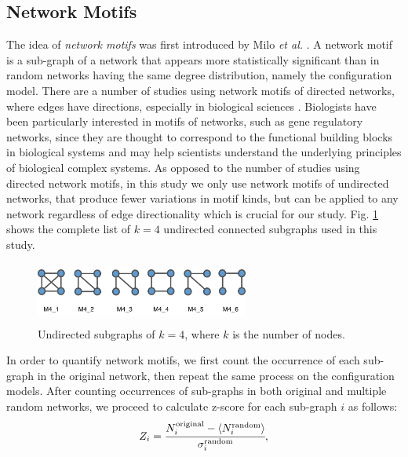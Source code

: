 \subsection*{Network Motifs} 
The idea of \textit{network motifs} was first introduced by Milo \textit{et al.} \cite{Milo_motif}. A network motif is a sub-graph of a network that appears more statistically significant than in random networks having the same degree distribution, namely the configuration model. There are a number of studies using network motifs of directed networks, where edges have directions, especially in biological sciences \cite{Alon2007, MotifsInBrain, NetworkMotifsEcoli}. Biologists have been particularly interested in motifs of networks, such as gene regulatory networks, since they are thought to correspond to the functional building blocks in biological systems and may help scientists understand the underlying principles of biological complex systems.
As opposed to the number of studies using directed network motifs, in this study we only use network motifs of undirected networks, that produce fewer variations in motif kinds, but can be applied to any network regardless of edge directionality which is crucial for our study. Fig. \ref{motifs} shows the complete list of $k=4$ undirected connected subgraphs used in this study.

\begin{figure}[ht]
	\begin{center}
		\vspace{0.5cm}
		\includegraphics[clip,width=7cm,height = 2cm]{figs/motifs.png}
		\vspace{0.5cm}
		\caption{Undirected subgraphs of $k =4$, where $k$ is the number of nodes.}
		\label{motifs}
	\end{center}
\end{figure}

In order to quantify network motifs, we first count the occurrence of each sub-graph in the original network, then repeat the same process on the configuration models. After counting occurrences of sub-graphs in both original and multiple random networks, we proceed to calculate z-score for each sub-graph $i$ as follows:
	\begin{equation}
	Z_i = \cfrac{N_i^{\text{original}} - \langle N_i^{\text{random}} \rangle }{\sigma_i^{\text{random}}},
	\end{equation}

